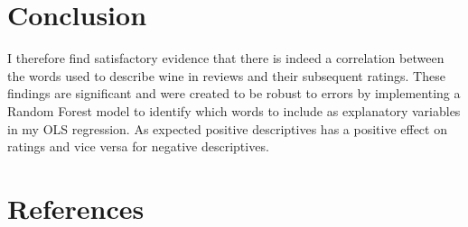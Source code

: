 \documentclass[11pt,preprint]{elsarticle}
\numberwithin{equation}{section}
\numberwithin{figure}{section}
\numberwithin{table}{section}
\begin{document}
\newpage

\section{\texorpdfstring{Conclusion
\label{Concl}}{Conclusion }}\label{conclusion}

I therefore find satisfactory evidence that there is indeed a
correlation between the words used to describe wine in reviews and their
subsequent ratings. These findings are significant and were created to
be robust to errors by implementing a Random Forest model to identify
which words to include as explanatory variables in my OLS regression. As
expected positive descriptives has a positive effect on ratings and vice
versa for negative descriptives.

\newpage

\section*{References}\label{references}
\end{document}
